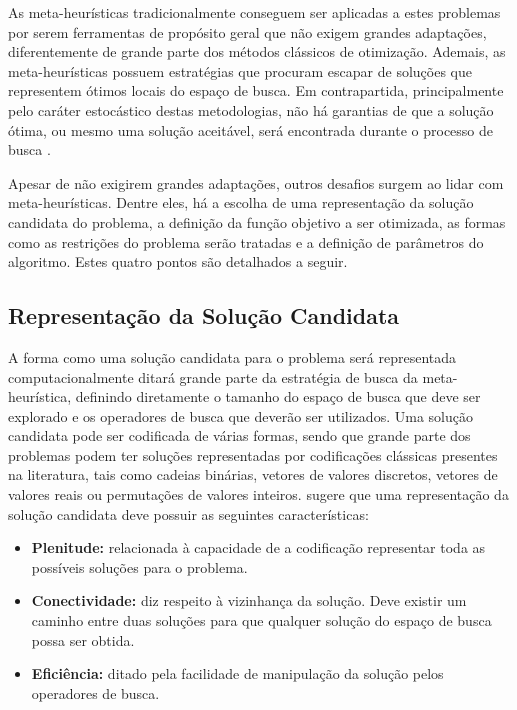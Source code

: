 As meta-heurísticas tradicionalmente conseguem ser aplicadas a estes problemas por serem ferramentas de propósito geral que não exigem grandes adaptações, diferentemente de grande parte dos métodos clássicos de otimização. Ademais, as meta-heurísticas possuem estratégias que procuram escapar de soluções que representem ótimos locais do espaço de busca. Em contrapartida, principalmente pelo caráter estocástico destas metodologias, não há garantias de que a solução ótima, ou mesmo uma solução aceitável, será encontrada durante o processo de busca \cite{Talbi2009}. 

Apesar de não exigirem grandes adaptações, outros desafios surgem ao lidar com meta-heurísticas. Dentre eles, há a escolha de uma representação da solução candidata do problema, a definição da função objetivo a ser otimizada, as formas como as restrições do problema serão tratadas e a definição de parâmetros do algoritmo. Estes quatro pontos são detalhados a seguir.

\subsection{Representação da Solução Candidata}
\label{subsec:subc211}
A forma como uma solução candidata para o problema será representada computacionalmente ditará grande parte da estratégia de busca da meta-heurística, definindo diretamente o tamanho do espaço de busca que deve ser explorado e os operadores de busca que deverão ser utilizados. Uma solução candidata pode ser codificada de várias formas, sendo que grande parte dos problemas podem ter soluções representadas por codificações clássicas presentes na literatura, tais como cadeias binárias, vetores de valores discretos, vetores de valores reais ou permutações de valores inteiros.  sugere que uma representação da solução candidata deve possuir as seguintes características:

\begin{itemize}
\item \textbf{Plenitude:} relacionada à capacidade de a codificação representar toda as possíveis soluções para o problema.
\item \textbf{Conectividade:} diz respeito à vizinhança da solução. Deve existir um caminho entre duas soluções para que qualquer solução do espaço de busca possa ser obtida.
\item \textbf{Eficiência:} ditado pela facilidade de manipulação da solução pelos operadores de busca.
\end{itemize}

